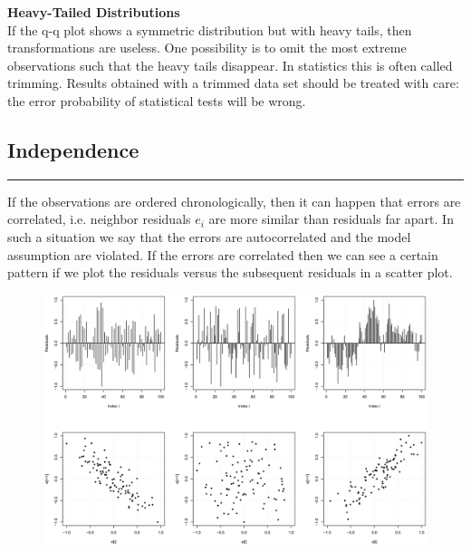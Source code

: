 \textbf{Heavy-Tailed Distributions}\\
If the q-q plot shows a symmetric distribution but with heavy tails, then transformations are useless. One possibility is to omit the most extreme observations such that the heavy tails disappear. In statistics this is often called trimming. Results obtained with a trimmed data set should be treated with care: the error probability of statistical tests will be wrong.

\subsection{Independence}
\noindent\rule[\linienAbstand]{\linewidth}{\linienDicke}
If the observations are ordered chronologically, then it can happen that errors are correlated, i.e. neighbor residuals $e_i$ are more similar than residuals far apart. In such a situation we say that the errors are autocorrelated and the model assumption are violated. If the errors are correlated then we can see a certain pattern if we plot the residuals versus the subsequent residuals in a scatter plot.

\begin{figure}[H]
  \centering
  \includegraphics[width=\linewidth]{Pics/8.4.1.png}
\end{figure}


